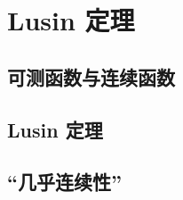 \section{Lusin 定理}
\label{b1:sec:0404}


\subsection{可测函数与连续函数}
\label{b1:subsec:040401}

\subsection{Lusin 定理}
\label{b1:subsec:040402}

\subsection{“几乎连续性”}
\label{b1:subsec:040403}


